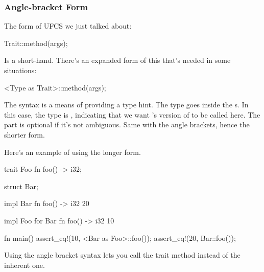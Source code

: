 \subsubsection*{Angle-bracket Form}

The form of UFCS we just talked about:

\begin{rustc}
Trait::method(args);
\end{rustc}

Is a short-hand. There's an expanded form of this that's needed in some situations:

\begin{rustc}
<Type as Trait>::method(args);
\end{rustc}

The \code{<>::} syntax is a means of providing a type hint. The type goes inside the \code{<>}s. In this case, the type is 
, indicating that we want 's version of  to be called here. The  part 
is optional if it's not ambiguous. Same with the angle brackets, hence the shorter form.

\blank

Here's an example of using the longer form.

\begin{rustc}
trait Foo {
    fn foo() -> i32;
}

struct Bar;

impl Bar {
    fn foo() -> i32 {
        20
    }
}

impl Foo for Bar {
    fn foo() -> i32 {
        10
    }
}

fn main() {
    assert_eq!(10, <Bar as Foo>::foo());
    assert_eq!(20, Bar::foo());
}
\end{rustc}

Using the angle bracket syntax lets you call the trait method instead of the inherent one.
